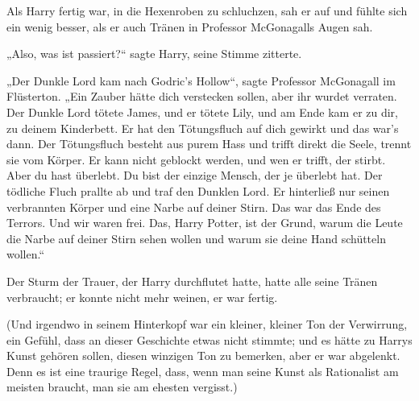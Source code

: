 Als Harry fertig war, in die Hexenroben zu schluchzen, sah er auf und fühlte sich ein wenig besser, als er auch Tränen in Professor McGonagalls Augen sah.

„Also, was ist passiert?“ sagte Harry, seine Stimme zitterte.

„Der Dunkle Lord kam nach Godric's Hollow“, sagte Professor McGonagall im Flüsterton. „Ein Zauber hätte dich verstecken sollen, aber ihr wurdet verraten. Der Dunkle Lord tötete James, und er tötete Lily, und am Ende kam er zu dir, zu deinem Kinderbett. Er hat den Tötungsfluch auf dich gewirkt und das war's dann. Der Tötungsfluch besteht aus purem Hass und trifft direkt die Seele, trennt sie vom Körper. Er kann nicht geblockt werden, und wen er trifft, der stirbt. Aber du hast überlebt. Du bist der einzige Mensch, der je überlebt hat. Der tödliche Fluch prallte ab und traf den Dunklen Lord. Er hinterließ nur seinen verbrannten Körper und eine Narbe auf deiner Stirn. Das war das Ende des Terrors. Und wir waren frei. Das, Harry Potter, ist der Grund, warum die Leute die Narbe auf deiner Stirn sehen wollen und warum sie deine Hand schütteln wollen.“

Der Sturm der Trauer, der Harry durchflutet hatte, hatte alle seine Tränen verbraucht; er konnte nicht mehr weinen, er war fertig.

(Und irgendwo in seinem Hinterkopf war ein kleiner, kleiner Ton der Verwirrung, ein Gefühl, dass an dieser Geschichte etwas nicht stimmte; und es hätte zu Harrys Kunst gehören sollen, diesen winzigen Ton zu bemerken, aber er war abgelenkt. Denn es ist eine traurige Regel, dass, wenn man seine Kunst als Rationalist am meisten braucht, man sie am ehesten vergisst.)

